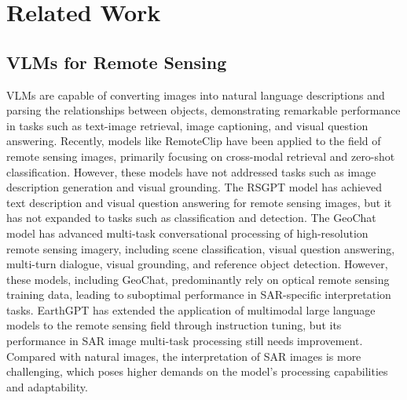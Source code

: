 \section{Related Work}
\subsection{VLMs for Remote Sensing}
VLMs are capable of converting images into natural language descriptions and parsing the relationships between objects, demonstrating remarkable performance in tasks such as text-image retrieval, image captioning, and visual question answering. Recently, models like RemoteClip \citep{liu2024remoteclip} have been applied to the field of remote sensing images, primarily focusing on cross-modal retrieval and zero-shot classification. However, these models have not addressed tasks such as image description generation and visual grounding. The RSGPT model has achieved text description and visual question answering for remote sensing images, but it has not expanded to tasks such as classification and detection. The GeoChat model has advanced multi-task conversational processing of high-resolution remote sensing imagery, including scene classification, visual question answering, multi-turn dialogue, visual grounding, and reference object detection. However, these models, including GeoChat, predominantly rely on optical remote sensing training data, leading to suboptimal performance in SAR-specific interpretation tasks. EarthGPT \citep{zhang2024earthgpt} has extended the application of multimodal large language models to the remote sensing field through instruction tuning, but its performance in SAR image multi-task processing still needs improvement. Compared with natural images, the interpretation of SAR images is more challenging, which poses higher demands on the model's processing capabilities and adaptability.

